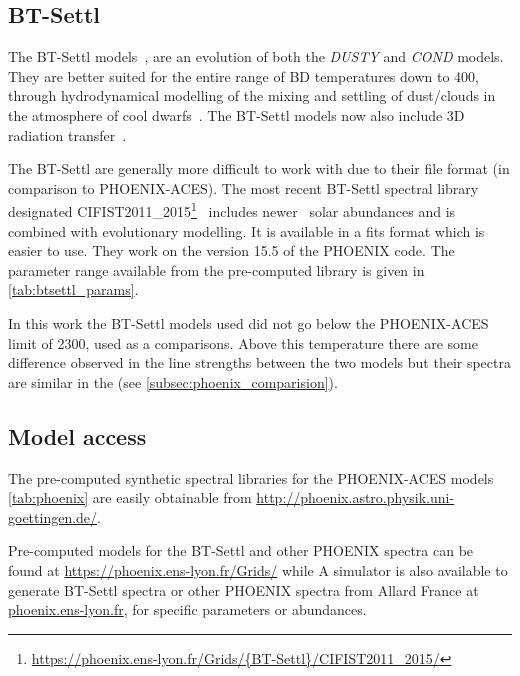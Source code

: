 \subsection{BT-Settl}
\label{subsec:btsettl}
The {BT-Settl} models~\citep{allard_models_2012,allard_atmospheres_2012,rajpurohit_effective_2013,baraffe_new_2015}, are an evolution of both the \emph{DUSTY} and \emph{COND} models.
They are better suited for the entire range of {BD} temperatures down to 400\K{}, through hydrodynamical modelling of the mixing and settling of dust/clouds in the atmosphere of cool dwarfs~\citep{freytag_role_2010}.
The {BT-Settl} models now also include 3D radiation transfer~\citep{seelmann_3d_2010}.


The {BT-Settl} are generally more difficult to work with due to their file format (in comparison to {PHOENIX-ACES}).
The most recent {BT-Settl} spectral library designated CIFIST2011\_2015\footnote{\url{https://phoenix.ens-lyon.fr/Grids/{BT-Settl}/CIFIST2011_2015/}}~\citep{baraffe_new_2015} includes newer~\citet{caffau_solar_2011} solar abundances and is combined with evolutionary modelling.
It is available in a fits format which is easier to use.
They work on the version 15.5 of the PHOENIX code.
The parameter range available from the pre-computed library is given in \cref{tab:btsettl_params}.



In this work the {BT-Settl} models used did not go below the {PHOENIX-ACES} limit of 2300\K{}, used as a comparisons.
Above this temperature there are some difference observed in the line strengths between the two models but their spectra are similar in the \nir{} (see \cref{subsec:phoenix_comparision}).


\subsection{Model access}
\label{subsec:model_access}
The pre-computed synthetic spectral libraries for the {PHOENIX-ACES} models \cref{tab:phoenix} are easily obtainable from \href{http://phoenix.astro.physik.uni-goettingen.de/}{http://phoenix.astro.physik.uni-goettingen.de/}.

Pre-computed models for the {BT-Settl} and other PHOENIX spectra can be found  at \href{https://phoenix.ens-lyon.fr/Grids/}{https://phoenix.ens-lyon.fr/Grids/} while
A simulator is also available to generate {BT-Settl} spectra or other {PHOENIX} spectra from {Allard France} at \href{phoenix.ens-lyon.fr}{phoenix.ens-lyon.fr}, for specific parameters or abundances.

